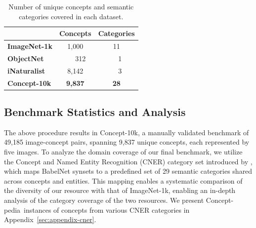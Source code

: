 \documentclass[11pt]{article}
\newcommand{\resource}{Concept-pedia}
\newcommand{\benchmark}{Concept-10k}
\begin{document}
\begin{table}
\centering
\setlength{\tabcolsep}{10pt} 
\begin{tabular}{l c c}
\toprule
\textbf{}        & \textbf{Concepts}    & \textbf{Categories} \\ 
\midrule
\textbf{ImageNet-1k}    & 1,000           & 11 \\ 
\textbf{ObjectNet}    & ~~~312           & ~~1 \\ 
\textbf{iNaturalist}    & 8,142           & ~~3 \\ 
\midrule

\textbf{Concept-10k}     & \textbf{9,837}           & \textbf{28}
\\ 
\bottomrule
\end{tabular}
\caption{Number of unique concepts and semantic categories covered in each dataset.}
\label{tab:conc_vs_rest_coverage}
\end{table}


\subsection{Benchmark Statistics and Analysis}
The above procedure results in \benchmark, a manually validated benchmark of 49,185 image-concept pairs, spanning 9,837 unique concepts, each represented by five images.
To analyze the domain coverage of our final benchmark, we utilize the Concept and Named Entity Recognition (CNER) category set introduced by \citet{martinelli-etal-2024-cner}, which maps BabelNet synsets to a predefined set of 29 semantic categories shared across concepts and entities. This mapping enables a systematic comparison of the diversity of our resource with that of ImageNet-1k, enabling an in-depth analysis of the category coverage of the two resources.
We present \resource~instances of concepts from various CNER categories in Appendix~\ref{sec:appendix-cner}.
\end{document}
